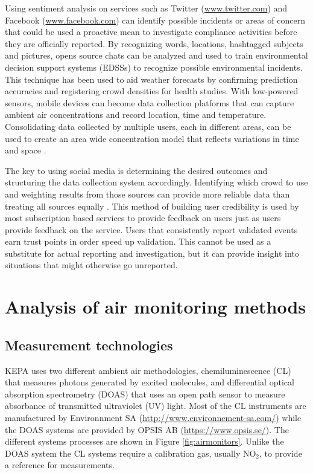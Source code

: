 Using sentiment analysis on services such as Twitter (\url{www.twitter.com}) and Facebook (\url{www.facebook.com}) can identify possible incidents or areas of concern that could be used a proactive mean to investigate compliance activities before they are officially reported.  By recognizing words, locations, hashtagged subjects and pictures, opens source chats can be analyzed and used to train environmental decision support systems (EDSSs) to recognize possible environmental incidents. This technique has been used to aid weather forecasts by confirming prediction accuracies and registering crowd densities for health studies\citep{Boulos2011, Weaver2016}. With low-powered sensors, mobile devices can become data collection platforms that can capture ambient air concentrations and record location, time and temperature. Consolidating data collected by multiple users, each in different areas, can be used to create an area wide concentration model that reflects variations in time and space \citep{Henriques2013}. 

The key to using social media is determining the desired outcomes and structuring the data collection system accordingly. Identifying which crowd to use and weighting results from those sources can provide more reliable data than treating all sources equally \citep{Comber2016}. This method of building user credibility is used by most subscription based services to provide feedback on users just as users provide feedback on the service. Users that consistently report validated events earn trust points in order speed up validation. This cannot be used as a substitute for actual reporting and investigation, but it can provide insight into situations that might otherwise go unreported.

\section{Analysis of air monitoring methods}

\subsection{Measurement technologies}

KEPA uses two different ambient air methodologies, chemiluminescence (CL) that measures photons generated by excited molecules, and differential optical absorption spectrometry (DOAS) that uses an open path sensor to measure absorbance of transmitted ultraviolet (UV) light. Most of the CL instruments are manufactured by Environnment SA (\url{http://www.environnement-sa.com/}) while the DOAS systems are provided by OPSIS AB (\url{https://www.opsis.se/}). The different systems processes are shown in Figure \ref{fig:airmonitors}.  Unlike the DOAS system the CL systems require a calibration gas, usually NO$_{2}$, to provide a reference for measurements.

